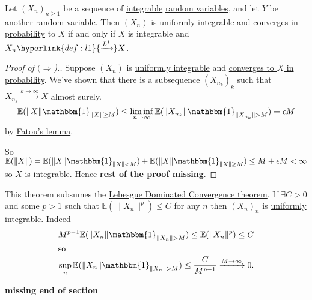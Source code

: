 \documentclass{article}
\newcommand{\1}[1]{\mathbbm{1}_{#1}}
\newcommand{\E}{\mathbb{E}}
\begin{document}
\begin{thm}
    Let $(X_n)_{n \geq 1}$ be a sequence of \hyperlink{def:integral}{integrable} \hyperlink{def:rv}{random variables}, and let $Y$ be another random variable.
    Then $(X_n)$ is \hyperlink{def:ui}{uniformly integrable} and \hyperlink{def:conv}{converges in probability} to $X$ if and only if $X$ is integrable and $X_n \hyperlink{def:l1}{\xrightarrow{L^1}} X$.
\end{thm}
\begin{proof}[Proof of $(\Rightarrow$).]
    Suppose $(X_n)$ is \hyperlink{def:ui}{uniformly integrable} and \hyperlink{def:conv}{converges to $X$ in probability}.
    We've shown that there is a subsequence $(X_{n_k})_k$ such that $X_{n_k} \xrightarrow{k \to \infty} X$ almost surely.
    \begin{equation*}
        \E(\|X\| \1{\|X\| \geq M}) \leq \liminf_{n \to \infty} \E(\|X_{n_k}\| \1{\|X_{n_k}\| > M}) = \epsilon M
    \end{equation*}
    by \hyperlink{thm:fatou}{Fatou's lemma}.

    So $\E(\|X\|) = \E(\|X\|\1{\|X\| < M}) + \E(\|X\|\1{\|X\| \geq M}) \leq M + \epsilon M < \infty$ so $X$ is integrable.
    Hence \textbf{rest of the proof missing}.
\end{proof}
\begin{remark}
    This theorem subsumes the \hyperlink{thm:dct}{Lebesgue Dominated Convergence theorem}.
    If $\exists C > 0$ and some $p>1$ such that $\E(\|X_n\|^p) \leq C$ for any $n$ then $(X_n)_n$ is \hyperlink{def:ui}{uniformly integrable}.
    Indeed
    \begin{align*}
        M^{p-1} \E(\|X_n\| \1{\|X_n\| > M}) \leq \E(\|X_n\|^p) \leq C \\
        \shortintertext{so}
        \sup_n\E(\|X_n\| \1{\|X_n\| > M}) \leq \frac{C}{M^{p-1}} \xrightarrow{M \to \infty} 0.
    \end{align*}
\end{remark}
\textbf{missing end of section}

\clearpage
\end{document}
